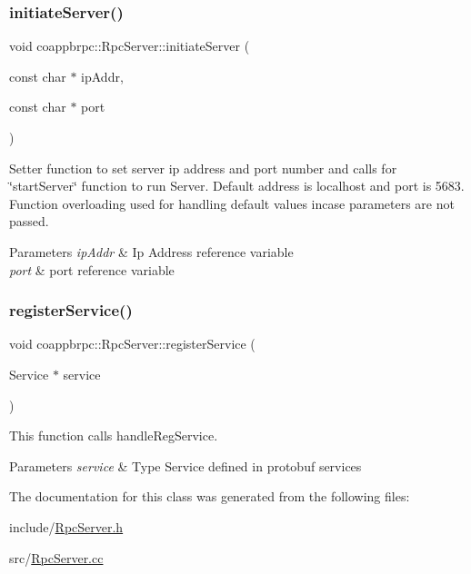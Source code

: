 \subsubsection{\texorpdfstring{initiate\+Server()}{initiateServer()}}
{\footnotesize\ttfamily void coappbrpc\+::\+Rpc\+Server\+::initiate\+Server (\begin{DoxyParamCaption}\item[{const char $\ast$}]{ip\+Addr,  }\item[{const char $\ast$}]{port }\end{DoxyParamCaption})}



Setter function to set server ip address and port number and calls for \char`\"{}start\+Server\char`\"{} function to run Server. Default address is localhost and port is 5683. Function overloading used for handling default values incase parameters are not passed. 


\begin{DoxyParams}{Parameters}
{\em ip\+Addr} & Ip Address reference variable \\
\hline
{\em port} & port reference variable \\
\hline
\end{DoxyParams}
\mbox{\label{classcoappbrpc_1_1RpcServer_acc9877a9bfff6783aa0261942d2917c2}} 
\subsubsection{\texorpdfstring{register\+Service()}{registerService()}}
{\footnotesize\ttfamily void coappbrpc\+::\+Rpc\+Server\+::register\+Service (\begin{DoxyParamCaption}\item[{Service $\ast$}]{service }\end{DoxyParamCaption})}



This function calls handle\+Reg\+Service. 


\begin{DoxyParams}{Parameters}
{\em service} & Type Service defined in protobuf services \\
\hline
\end{DoxyParams}


The documentation for this class was generated from the following files\+:\begin{DoxyCompactItemize}
\item 
include/\hyperlink{RpcServer_8h}{Rpc\+Server.\+h}\item 
src/\hyperlink{RpcServer_8cc}{Rpc\+Server.\+cc}\end{DoxyCompactItemize}
